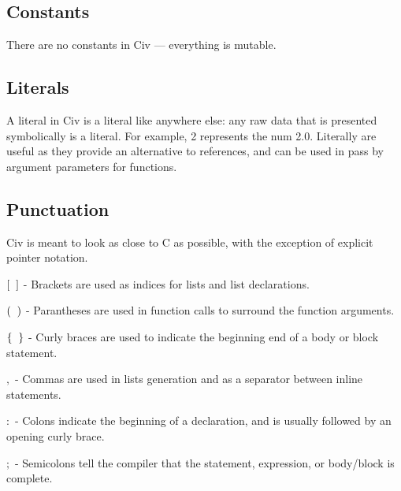 \documentclass[a4paper]{article}
\begin{document}
\begin{multicols}{2}
\noindent 
{}
\end{multicols}


\subsection{Constants}

There are no constants in Civ — everything is mutable.

\subsection{Literals}

A literal in Civ is a literal like anywhere else: any raw data that is presented symbolically is a literal. For example, 2 represents the num 2.0. Literally are useful as they provide an alternative to references, and can be used in pass by argument parameters for functions.

\subsection{Punctuation}

Civ is meant to look as close to C as possible, with the exception of explicit pointer notation.

\begin{description}
	\item{$[\hspace{2mm}]$} - Brackets are used as indices for lists and list declarations.
	\item{$(\hspace{2mm})$} - Parantheses are used in function calls to surround the function arguments.
    \item{$\{\hspace{2mm}\}$} - Curly braces are used to indicate the beginning end of a body or block statement.
    \item{$,$} - Commas are used in lists generation and as a separator between inline statements.
    \item{$:$} - Colons indicate the beginning of a declaration, and is usually followed by an opening curly brace.
    \item{$;$} - Semicolons tell the compiler that the statement, expression, or body/block is complete.
\end{description}
\end{document}
